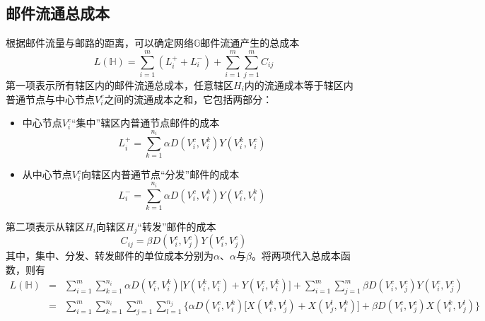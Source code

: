 \subsection{邮件流通总成本}
根据邮件流量与邮路的距离，可以确定网络$\mathbb{G}$邮件流通产生的总成本
\begin{equation}
    L(\mathbb{H}) = \sum\limits_{i = 1}^m (L_i^{+} + L_i^{-}) + \sum\limits_{i = 1}^m \sum\limits_{j = 1}^m C_{ij}
\end{equation}
第一项表示所有辖区内的邮件流通总成本，任意辖区$H_i$内的流通成本等于辖区内普通节点与中心节点$V_i^c$之间的流通成本之和，它包括两部分：
\begin{itemize}
  \item 中心节点$V_i^c$“集中”辖区内普通节点邮件的成本
\begin{equation}
    L_i^{+} = \sum\limits_{k = 1}^{n_i} \alpha D(V_i^c, V_i^k) Y(V_i^k, V_i^c)
\end{equation}
  \item 从中心节点$V_i^c$向辖区内普通节点“分发”邮件的成本
\begin{equation}
    L_i^{-} = \sum\limits_{k = 1}^{n_i} \alpha D(V_i^c, V_i^k) Y(V_i^c, V_i^k)
\end{equation}
\end{itemize}

第二项表示从辖区$H_i$向辖区$H_j$“转发”邮件的成本
\begin{equation}
    C_{ij} = \beta D(V_i^c, V_j^c) Y(V_i^c, V_j^c)
\end{equation}
其中，集中、分发、转发邮件的单位成本分别为$\alpha$、$\alpha$与$\beta$。将两项代入总成本函数，则有
\begin{equation}
    \begin{array}{lll}
      L(\mathbb{H}) & = & \sum\limits_{i = 1}^m \sum\limits_{k = 1}^{n_i} \alpha D(V_i^c, V_i^k)\big[Y(V_i^k, V_i^c) + Y(V_i^c, V_i^k)\big] + \sum\limits_{i = 1}^m \sum\limits_{j = 1}^m \beta D(V_i^c, V_j^c) Y(V_i^c, V_j^c)  \\
        & = & \sum\limits_{i = 1}^m \sum\limits_{k = 1}^{n_i} \sum\limits_{j = 1}^m \sum\limits_{l = 1}^{n_j} \Big\{\alpha D(V_i^c, V_i^k) \big[X(V_i^k, V_j^l) + X(V_j^l, V_i^k)\big] + \beta D(V_i^c, V_j^c) X(V_i^k, V_j^l) \Big\}
    \end{array}
\end{equation}

